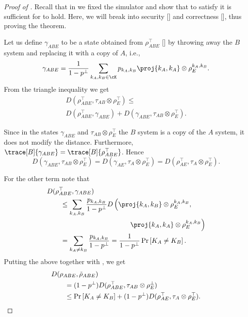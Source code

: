 \begin{proof}[Proof of ]
  Recall that in  we fixed the
  simulator and show that to satisfy  it is
  sufficient for  to hold. Here, we will
  break  into security []
  and correctness [], thus proving the theorem.

  Let us define $\gamma_{ABE}$ to be a state obtained from
  $\rho^{\top}_{ABE}$ [] by throwing away
  the $B$ system and replacing it with a copy of $A$, i.e., \[
  \gamma_{ABE} = \frac{1}{1-p^\bot} \sum_{k_A,k_B \in \cK} p_{k_A,k_B}
  \proj{k_A,k_A} \otimes \rho^{k_A,k_B}_E.\] From the triangle
  inequality we get \begin{multline*} D(\rho^\top_{ABE},\tau_{AB} \otimes
  \rho^\top_{E}) \leq \\ D(\rho^\top_{ABE},\gamma_{ABE}) +
  D(\gamma_{ABE},\tau_{AB} \otimes \rho^\top_{E}) .\end{multline*}

Since in the states $\gamma_{ABE}$ and
$\tau_{AB} \otimes \rho^\top_{E}$ the $B$ system is a copy of the $A$
system, it does not modify the distance. Furthermore,
$\trace[B]{\gamma_{ABE}} =
\trace[B]{\rho^{\top}_{ABE}}$. Hence
\[D(\gamma_{ABE},\tau_{AB} \otimes \rho^\top_{E}) =
  D(\gamma_{AE},\tau_{A} \otimes \rho^\top_{E}) =
  D(\rho^\top_{AE},\tau_{A} \otimes \rho^\top_{E}).\]

For the other term note that
\begin{align*}
  & D(\rho^\top_{ABE},\gamma_{ABE}) \\
  & \qquad \leq \sum_{k_A,k_B} \frac{p_{k_A,k_B}}{1-p^{\bot}}
    D\left(\proj{k_A,k_B} \otimes \rho^{k_A,k_B}_E,\right. \\
  & \qquad \qquad \qquad \qquad \qquad \qquad \left.\proj{k_A,k_A} \otimes \rho^{k_A,k_B}_E \right)\\
  & \qquad = \sum_{k_A \neq k_B} \frac{p_{k_A,k_B}}{1-p^{\bot}} = \frac{1}{1-p^{\bot}}\Pr
  \left[ K_A \neq K_B \right].
\end{align*}
Putting the above together with , we get
\begin{align*} & D(\rho_{ABE},\tilde{\rho}_{ABE}) \\
  & \qquad = (1-p^\bot)
  D(\rho^\top_{ABE},\tau_{AB} \otimes \rho^\bot_{E}) \\ & \qquad \leq \Pr
  \left[ K_A \neq K_B \right] + (1-p^\bot) D(\rho^\top_{AE},\tau_{A}
  \otimes \rho^\top_{E}). \qedhere \end{align*}
\end{proof}

